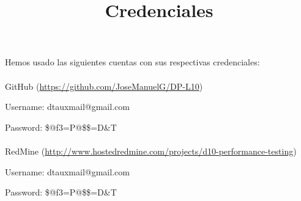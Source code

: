 \documentclass[a4paper]{article}
\title{Credenciales}
\date{}
\begin{document}
\setlength{\voffset}{-1in}
\setlength{\textheight}{680px}
\setlength{\headsep}{30px}
\maketitle

Hemos usado las siguientes cuentas con sus respectivas credenciales:
\\
\\
GitHub (\url{https://github.com/JoseManuelG/DP-L10})

Username: dtauxmail@gmail.com

Password: \$@f3=P@\$\$=D\&T
\\
\\
RedMine (\url{http://www.hostedredmine.com/projects/d10-performance-testing})

Username: dtauxmail@gmail.com

Password: \$@f3=P@\$\$=D\&T
\end{document}

